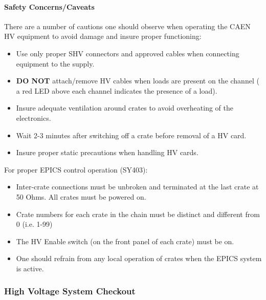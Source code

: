 {\paragraph{Safety Concerns/Caveats}

There are a number of cautions one should observe when operating
the CAEN HV equipment to avoid damage and insure proper functioning:

\begin{itemize}
\item{Use only proper SHV connectors and approved cables when
connecting equipment to the supply.}
\item{{\bf DO NOT} attach/remove HV cables when loads are present on the
channel ( a red LED above each channel indicates the presence of a
load).}
\item{Insure adequate ventilation around crates to avoid overheating
of the electronics.}
\item{Wait 2-3 minutes after switching off a crate before removal of a
HV card.}
\item{Insure proper static precautions when handling HV cards.}
\end{itemize}

For proper EPICS control operation (SY403):

\begin{itemize}
\item{Inter-crate connections must be unbroken and terminated at the
last crate at 50 Ohms.  All crates must be powered on.}
\item{Crate numbers for each crate in the chain must be distinct and
different from 0 (i.e. 1-99)}
\item{The HV Enable switch (on the front panel of each crate) must be on.}
\item{One should refrain from any local operation of crates when the
EPICS system is active.}
\end{itemize}
}

\subsubsection{High Voltage System Checkout}
\label{sec:highvoltagecheckout}

